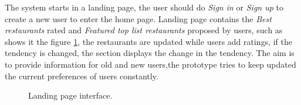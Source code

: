 The system starts in a landing page, the user should do \textit{Sign in} or
\textit{Sign up} to create a new user to enter the home page. 
Landing page contains the \textit{Best restaurants} rated and 
\textit{Featured top list restaurants}
proposed by users, such as shows it the figure \ref{fig:landing}, 
the restaurants are updated while users add ratings, 
if the tendency is changed, the section displays the change 
in the tendency. The aim is to provide
information for old and new users,the prototype tries to keep updated
the current preferences of users constantly.
\begin{figure}
\captionsetup{font=footnotesize}
\centering
{}
\caption{Landing page interface.}
\label{fig:landing}   
\end{figure}
